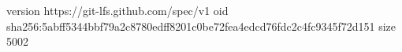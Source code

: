 version https://git-lfs.github.com/spec/v1
oid sha256:5abff5344bbf79a2c8780edff8201c0be72fea4edcd76fdc2c4fc9345f72d151
size 5002
